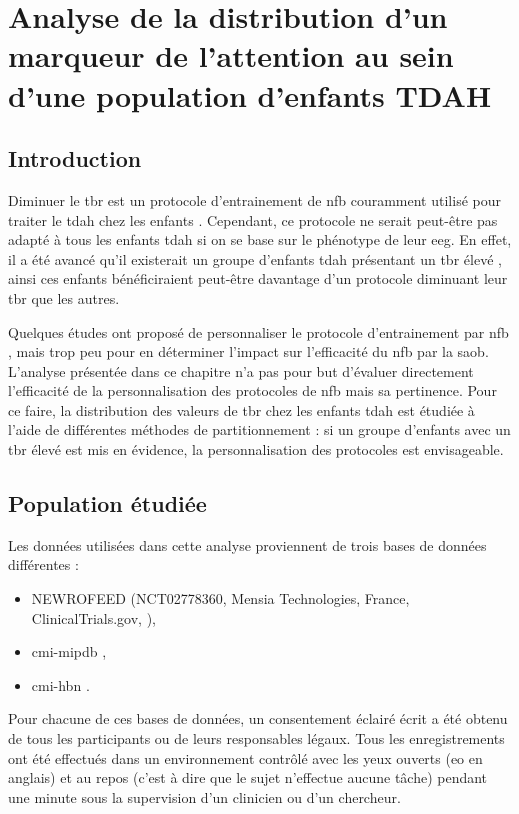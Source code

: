 \chapter{Analyse de la distribution d'un marqueur de l'attention au sein d'une population d'enfants TDAH}

\section*{Introduction}
Diminuer le \gls{tbr} est un protocole d'entrainement de \gls{nfb} couramment utilisé pour traiter le \gls{tdah} chez les enfants 
\citep{Arnold2014, Deilami2016, Gevensleben2009, VanDongen2013}. Cependant, ce protocole ne serait peut-être pas adapté à tous les enfants \gls{tdah} si 
on se base sur le phénotype de leur \gls{eeg}. En effet, il a été avancé qu'il existerait un groupe d'enfants \gls{tdah} présentant un \gls{tbr} élevé 
\citep{Zhang2017, Clarke2011}, ainsi ces enfants bénéficiraient peut-être davantage d'un protocole diminuant leur \gls{tbr} que les autres. 

Quelques études ont proposé de personnaliser le protocole d'entrainement par \gls{nfb} \citep{Bazanova2018, Escolano2014}, mais trop peu pour en déterminer
l'impact sur l'efficacité du \gls{nfb} par la \gls{saob}. L'analyse présentée dans ce chapitre n'a pas pour but d'évaluer directement l'efficacité de la 
personnalisation des protocoles de \gls{nfb} mais sa pertinence. Pour ce faire, la distribution des valeurs de \gls{tbr} chez les enfants \gls{tdah} est 
étudiée à l'aide de différentes méthodes de partitionnement : si un groupe d'enfants avec un \gls{tbr} élevé est mis en évidence, la personnalisation 
des protocoles est envisageable. 

\section{Population étudiée}

Les données utilisées dans cette analyse proviennent de trois bases de données différentes :
\begin{itemize}
\item NEWROFEED (NCT02778360, Mensia Technologies, France, ClinicalTrials.gov, \citet{Bioulac2019}),
\item \gls{cmi-mipdb} \citep{Langer2017, Langer2017b},
\item \gls{cmi-hbn} \citep{Alexander2017, Alexander2017b}.
\end{itemize}
Pour chacune de ces bases de données, un consentement éclairé écrit a été obtenu de tous les participants ou de leurs responsables légaux. Tous les enregistrements
ont été effectués dans un environnement contrôlé avec les yeux ouverts (\gls{eo} en anglais) et au repos (c'est à dire que le sujet n'effectue aucune tâche) 
pendant une minute sous la supervision d'un clinicien ou d'un chercheur. 

